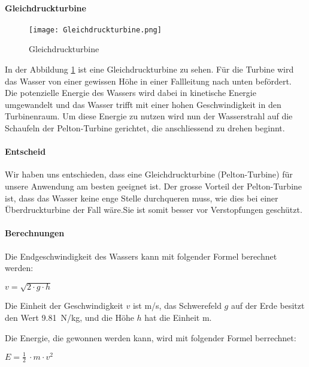 \paragraph{Gleichdruckturbine}
\begin{figure} [H]
	\centering
	\texttt{[image: Gleichdruckturbine.png]}
	\caption{Gleichdruckturbine \cite{wiki_gleichdruckturbine}}
	\label{fig:Gleichdruckturbine}
\end{figure}

In der Abbildung \ref{fig:Gleichdruckturbine}  ist eine Gleichdruckturbine zu sehen. Für die Turbine wird das Wasser von einer gewissen Höhe in einer Fallleitung nach unten befördert. Die potenzielle Energie des Wassers wird dabei in kinetische Energie umgewandelt und das Wasser trifft mit einer hohen Geschwindigkeit in den Turbinenraum. Um diese Energie zu nutzen wird nun der Wasserstrahl auf die Schaufeln der Pelton-Turbine gerichtet, die anschliessend zu drehen beginnt. 


\newpage

\paragraph{Entscheid}

Wir haben uns entschieden, dass eine Gleichdruckturbine (Pelton-Turbine) für unsere Anwendung am besten geeignet ist. Der grosse Vorteil der Pelton-Turbine ist, dass das Wasser keine enge Stelle durchqueren muss, wie dies bei einer Überdruckturbine der Fall wäre.Sie ist somit besser  vor Verstopfungen geschützt.

\paragraph{Berechnungen}

Die Endgeschwindigkeit des Wassers kann mit folgender Formel berechnet werden:
\begin{center}
\(v = \sqrt{2 \cdot g \cdot h} \)
\end{center}

Die Einheit der Geschwindigkeit \(v\) ist \si{m/s}, das Schwerefeld \(g\) auf der Erde besitzt den Wert 9.81~\si{N/kg}, und die Höhe \(h\) hat die Einheit \si{m}.

\bigskip

Die Energie, die gewonnen werden kann, wird mit folgender Formel berrechnet:

\begin{center}
\(E =\frac 12\ \cdot m \cdot v^2\)
\end{center}


